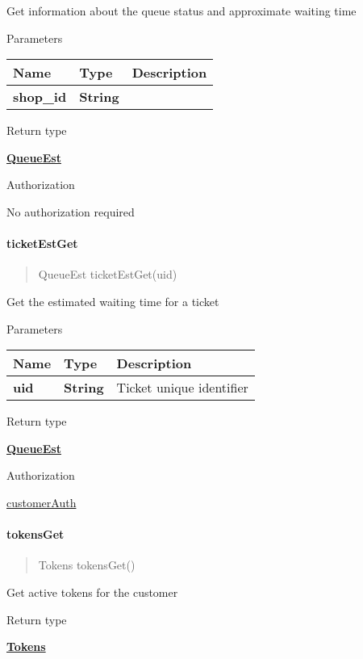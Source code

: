 Get information about the queue status and approximate waiting time

Parameters

\begin{longtable}[]{@{}lll@{}}
\toprule
Name & Type & Description\tabularnewline
\midrule
\endhead
\textbf{shop\_id} & \textbf{String} &\tabularnewline
\bottomrule
\end{longtable}

Return type

\href{../Models/QueueEst.md}{\textbf{QueueEst}}

Authorization

No authorization required

\hypertarget{ticketestget}{%
\paragraph{\texorpdfstring{\textbf{ticketEstGet}}{ticketEstGet}}\label{ticketestget}}

\begin{quote}
QueueEst ticketEstGet(uid)
\end{quote}

Get the estimated waiting time for a ticket

Parameters

\begin{longtable}[]{@{}lll@{}}
\toprule
Name & Type & Description\tabularnewline
\midrule
\endhead
\textbf{uid} & \textbf{String} & Ticket unique identifier\tabularnewline
\bottomrule
\end{longtable}

Return type

\href{../Models/QueueEst.md}{\textbf{QueueEst}}

Authorization

\href{../README.md\#customerAuth}{customerAuth}

\hypertarget{tokensget-1}{%
\paragraph{\texorpdfstring{\textbf{tokensGet}}{tokensGet}}\label{tokensget-1}}

\begin{quote}
Tokens tokensGet()
\end{quote}

Get active tokens for the customer

Return type

\href{../Models/Tokens.md}{\textbf{Tokens}}

